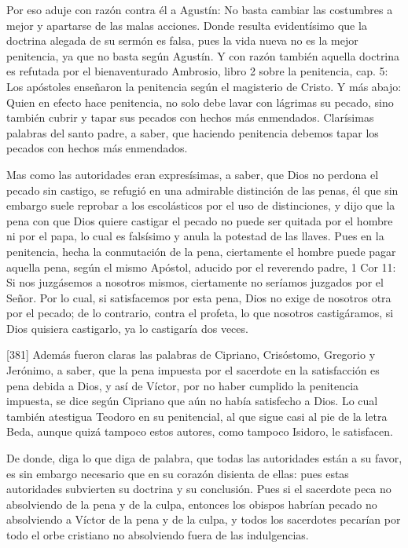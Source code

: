 Por eso aduje con razón contra él a Agustín: No basta cambiar las costumbres a mejor y apartarse de las malas acciones. Donde resulta evidentísimo que la doctrina alegada de su sermón es falsa, pues la vida nueva no es la mejor penitencia, ya que no basta según Agustín. Y con razón también aquella doctrina es refutada por el bienaventurado Ambrosio, libro 2 sobre la penitencia, cap. 5: Los apóstoles enseñaron la penitencia según el magisterio de Cristo. Y más abajo: Quien en efecto hace penitencia, no solo debe lavar con lágrimas su pecado, sino también cubrir y tapar sus pecados con hechos más enmendados. Clarísimas palabras del santo padre, a saber, que haciendo penitencia debemos tapar los pecados con hechos más enmendados.

Mas como las autoridades eran expresísimas, a saber, que Dios no perdona el pecado sin castigo, se refugió en una admirable distinción de las penas, él que sin embargo suele reprobar a los escolásticos por el uso de distinciones, y dijo que la pena con que Dios quiere castigar el pecado no puede ser quitada por el hombre ni por el papa, lo cual es falsísimo y anula la potestad de las llaves. Pues en la penitencia, hecha la conmutación de la pena, ciertamente el hombre puede pagar aquella pena, según el mismo Apóstol, aducido por el reverendo padre, 1 Cor 11: Si nos juzgásemos a nosotros mismos, ciertamente no seríamos juzgados por el Señor. Por lo cual, si satisfacemos por esta pena, Dios no exige de nosotros otra por el pecado; de lo contrario, contra el profeta, lo que nosotros castigáramos, si Dios quisiera castigarlo, ya lo castigaría dos veces.

[381] Además fueron claras las palabras de Cipriano, Crisóstomo, Gregorio y Jerónimo, a saber, que la pena impuesta por el sacerdote en la satisfacción es pena debida a Dios, y así de Víctor, por no haber cumplido la penitencia impuesta, se dice según Cipriano que aún no había satisfecho a Dios. Lo cual también atestigua Teodoro en su penitencial, al que sigue casi al pie de la letra Beda, aunque quizá tampoco estos autores, como tampoco Isidoro, le satisfacen.

De donde, diga lo que diga de palabra, que todas las autoridades están a su favor, es sin embargo necesario que en su corazón disienta de ellas: pues estas autoridades subvierten su doctrina y su conclusión. Pues si el sacerdote peca no absolviendo de la pena y de la culpa, entonces los obispos habrían pecado no absolviendo a Víctor de la pena y de la culpa, y todos los sacerdotes pecarían por todo el orbe cristiano no absolviendo fuera de las indulgencias.

